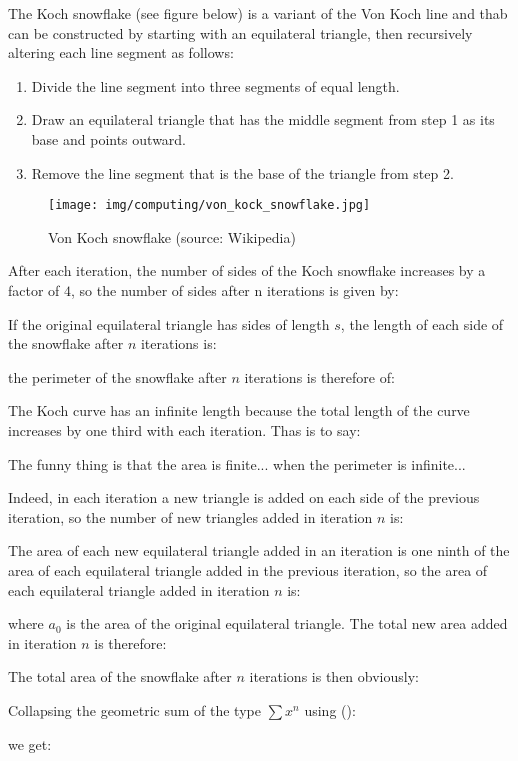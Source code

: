 	The Koch snowflake (see figure below) is a variant of the Von Koch line and thab can be constructed by starting with an equilateral triangle, then recursively altering each line segment as follows:
	\begin{enumerate}
		\item Divide the line segment into three segments of equal length.
		\item Draw an equilateral triangle that has the middle segment from step 1 as its base and points outward.
		\item Remove the line segment that is the base of the triangle from step 2.
	\end{enumerate}
	\begin{figure}[H]
		\centering
		\texttt{[image: img/computing/von\_kock\_snowflake.jpg]}
		\caption[]{Von Koch snowflake (source: Wikipedia)}
	\end{figure}
	After each iteration, the number of sides of the Koch snowflake increases by a factor of $4$, so the number of sides after n iterations is given by:
	
	If the original equilateral triangle has sides of length $s$, the length of each side of the snowflake after $n$ iterations is:
	
	the perimeter of the snowflake after $n$ iterations is therefore of:
	
	The Koch curve has an infinite length because the total length of the curve increases by one third with each iteration. Thas is to say:
	
	The funny thing is that the area is finite... when the perimeter is infinite...
	
	Indeed, in each iteration a new triangle is added on each side of the previous iteration, so the number of new triangles added in iteration $n$ is:
	
	The area of each new equilateral triangle added in an iteration is one ninth of the area of each equilateral  triangle added in the previous iteration, so the area of each equilateral  triangle added in iteration $n$ is:
	
	where $a_0$ is the area of the original equilateral  triangle. The total new area added in iteration $n$ is therefore:
	
	The total area of the snowflake after $n$ iterations is then obviously:
	
	Collapsing the geometric sum of the type $\sum x^n$ using ():
	
	we get:
	
